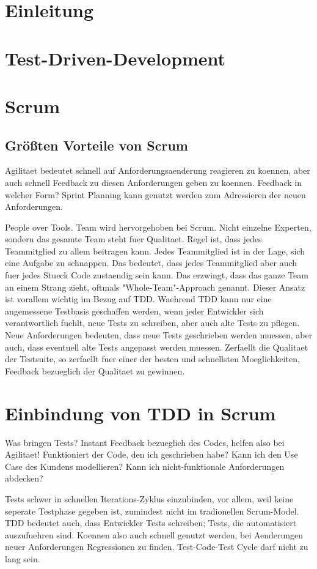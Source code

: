 \documentclass[12pt,DIV14,BCOR10mm,a4paper,twoside,parskip=half-,headsepline,headinclude,english,ngerman,bibliography=totocnumbered]{scrreprt}
\begin{document}
\chapter{Einleitung}
\chapter{Test-Driven-Development}
\chapter{Scrum}
\section{Größten Vorteile von Scrum}

Agilitaet bedeutet schnell auf Anforderungsaenderung reagieren zu koennen, aber auch schnell Feedback zu diesen Anforderungen geben zu koennen.
Feedback in welcher Form?
Sprint Planning kann genutzt werden zum Adressieren der neuen Anforderungen.

People over Tools.
Team wird hervorgehoben bei Scrum.
Nicht einzelne Experten, sondern das gesamte Team steht fuer Qualitaet.
Regel ist, dass jedes Teammitglied zu allem beitragen kann.
Jedes Teammitglied ist in der Lage, sich eine Aufgabe zu schnappen.
Das bedeutet, dass jedes Teammitglied aber auch fuer jedes Stueck Code zustaendig sein kann.
Das erzwingt, dass das ganze Team an einem Strang zieht, oftmals "Whole-Team"-Approach genannt.
Dieser Ansatz ist vorallem wichtig im Bezug auf TDD.
Waehrend TDD kann nur eine angemessene Testbasis geschaffen werden, wenn jeder Entwickler sich verantwortlich fuehlt, neue Tests zu schreiben, aber auch alte Tests zu pflegen.
Neue Anforderungen bedeuten, dass neue Tests geschrieben werden muessen, aber auch, dass eventuell alte Tests angepasst werden muessen.
Zerfaellt die Qualitaet der Testsuite, so zerfaellt fuer einer der besten und schnellsten Moeglichkeiten, Feedback bezueglich der Qualitaet zu gewinnen.


\chapter{Einbindung von TDD in Scrum}

Was bringen Tests?
Instant Feedback bezueglich des Codes, helfen also bei Agilitaet!
Funktioniert der Code, den ich geschrieben habe?
Kann ich den Use Case des Kundens modellieren?
Kann ich nicht-funktionale Anforderungen abdecken?

Tests schwer in schnellen Iterations-Zyklus einzubinden, vor allem, weil keine seperate Testphase gegeben ist, zumindest nicht im tradionellen Scrum-Model.
TDD bedeutet auch, dass Entwickler Tests schreiben; Tests, die automatisiert auszufuehren sind.
Koennen also auch schnell genutzt werden, bei Aenderungen neuer Anforderungen Regressionen zu finden.
Test-Code-Test Cycle darf nicht zu lang sein.
\end{document}
